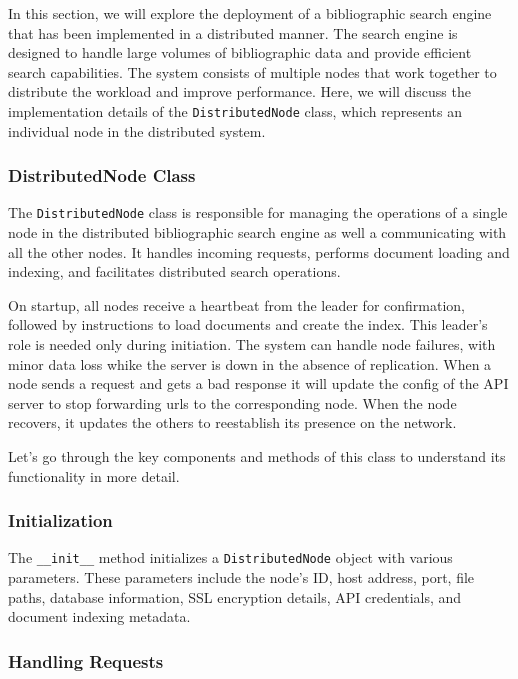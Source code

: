\documentclass{article}
\begin{document}
In this section, we will explore the deployment of a bibliographic search engine that has 
been implemented in a distributed manner. The search engine is designed to handle large 
volumes of bibliographic data and provide efficient search capabilities. The system consists 
of multiple nodes that work together to distribute the workload and improve performance. Here, 
we will discuss the implementation details of the \texttt{DistributedNode} class, which 
represents an individual node in the distributed system.

\subsubsection{DistributedNode Class}
\label{sec:distributed}

The \texttt{DistributedNode} class is responsible for managing the operations of a single node 
in the distributed bibliographic search engine as well a communicating with all the other nodes. 
It handles incoming requests, performs document loading and indexing, and facilitates distributed 
search operations. 

On startup, all nodes receive a heartbeat from the leader for confirmation, followed by 
instructions to load documents and create the index. This leader's role is needed only 
during initiation. The system can handle node failures, with minor data loss whike the 
server is down in the absence of replication. When a node sends a request and gets a bad 
response it will update the config of the API server to stop forwarding urls to the 
corresponding node. When the node recovers, it updates the others to reestablish its 
presence on the network.

Let's go through the key components and methods of this class to understand its functionality
 in more detail.


\subsubsection*{Initialization}

The \texttt{\_\_init\_\_} method initializes a \texttt{DistributedNode} object with various 
parameters. These parameters include the node's ID, host address, port, file paths, database 
information, SSL encryption details, API credentials, and document indexing metadata.


\subsubsection*{Handling Requests}
\end{document}
